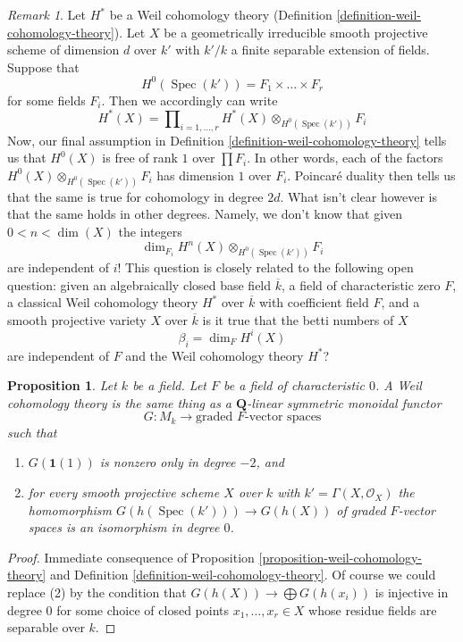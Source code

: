 \documentclass{stacks-project}
\theoremstyle{plain}
\newtheorem{proposition}[subsection]{Proposition}
\theoremstyle{definition}
\theoremstyle{remark}
\newtheorem{remark}[subsection]{Remark}
\numberwithin{equation}{subsection}
\def\Spec{\mathop{\mathrm{Spec}}}
\begin{document}
\begin{remark}
\label{remark-betti-numbers-in-some-sense}
Let $H^*$ be a Weil cohomology theory
(Definition \ref{definition-weil-cohomology-theory}).
Let $X$ be a geometrically irreducible smooth projective scheme
of dimension $d$ over $k'$ with $k'/k$ a finite separable extension of fields.
Suppose that
$$
H^0(\Spec(k')) = F_1 \times \ldots \times F_r
$$
for some fields $F_i$. Then we accordingly can write
$$
H^*(X) = \prod\nolimits_{i = 1, \ldots, r}
H^*(X) \otimes_{H^0(\Spec(k'))} F_i
$$
Now, our final assumption in Definition \ref{definition-weil-cohomology-theory}
tells us that $H^0(X)$ is free of rank $1$ over $\prod F_i$.
In other words, each of the factors
$H^0(X) \otimes_{H^0(\Spec(k'))} F_i$ has dimension $1$ over $F_i$.
Poincar\'e duality then tells us that the same is true for
cohomology in degree $2d$.
What isn't clear however is that the same holds in other degrees.
Namely, we don't know that given $0 < n < \dim(X)$ the integers
$$
\dim_{F_i} H^n(X) \otimes_{H^0(\Spec(k'))} F_i
$$
are independent of $i$! This question is closely related to the following
open question: given an algebraically closed base field $\overline{k}$,
a field of characteristic zero $F$, a classical Weil cohomology theory
$H^*$ over $\overline{k}$ with coefficient field $F$, and a smooth projective
variety $X$ over $\overline{k}$ is it true that the betti numbers of $X$
$$
\beta_i = \dim_F H^i(X)
$$
are independent of $F$ and the Weil cohomology theory $H^*$?
\end{remark}

\begin{proposition}
\label{proposition-weil-cohomology-theory-again}
Let $k$ be a field. Let $F$ be a field of characteristic $0$.
A Weil cohomology theory is the same thing as a $\mathbf{Q}$-linear
symmetric monoidal functor
$$
G : M_k \longrightarrow \text{graded }F\text{-vector spaces}
$$
such that
\begin{enumerate}
\item $G(\mathbf{1}(1))$ is nonzero only in degree $-2$, and
\item for every smooth projective scheme $X$ over $k$ with
$k' = \Gamma(X, \mathcal{O}_X)$ the homomorphism
$G(h(\Spec(k'))) \to G(h(X))$ of graded $F$-vector spaces
is an isomorphism in degree $0$.
\end{enumerate}
\end{proposition}

\begin{proof}
Immediate consequence of Proposition \ref{proposition-weil-cohomology-theory}
and Definition \ref{definition-weil-cohomology-theory}. Of course we could
replace (2) by the condition that $G(h(X)) \to \bigoplus G(h(x_i))$
is injective in degree $0$ for some choice of closed points
$x_1, \ldots, x_r \in X$ whose residue fields are separable over $k$.
\end{proof}
\end{document}
